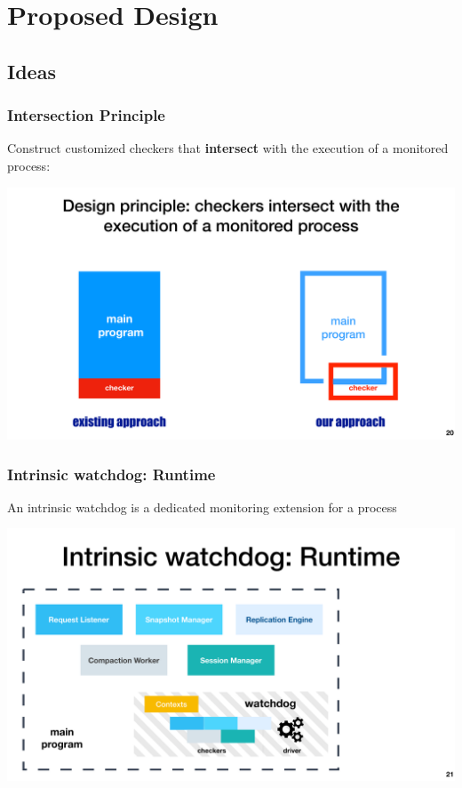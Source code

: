 \documentclass[aspectratio=169]{beamer}
\begin{document}
\section{Proposed Design}

\subsection{Ideas}

\begin{frame}
    \frametitle{Intersection Principle}

    Construct
    customized checkers that \textbf{intersect} with the execution of a monitored process:

    \begin{center}
        \includegraphics[width=.85\textwidth]{fig/intersect.pdf}
    \end{center}
\end{frame}

\begin{frame}
    \frametitle{Intrinsic watchdog: Runtime}
    An intrinsic watchdog is a dedicated monitoring extension for a process

    \begin{center}
        \includegraphics[width=.75\textwidth]{fig/watchdog.pdf}
    \end{center}
\end{frame}
\end{document}
